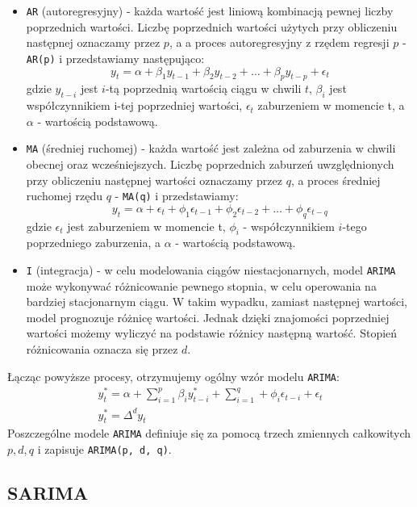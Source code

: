 \documentclass[12pt]{article}
\begin{document}
\begin{itemize}
    \item \texttt{AR} (autoregresyjny) - każda wartość jest liniową kombinacją pewnej liczby poprzednich wartości. Liczbę poprzednich wartości użytych przy obliczeniu następnej oznaczamy przez $p$, a a proces autoregresyjny z rzędem regresji $p$ - \texttt{AR(p)} i przedstawiamy następująco:
    \[
        y_t = \alpha + \beta_1y_{t-1} + \beta_2y_{t-2} + \dots + \beta_py_{t-p} + \epsilon_t
    \]
    gdzie $y_{t-i}$ jest $i$-tą poprzednią wartością ciągu w chwili $t$, $\beta_i$ jest współczynnikiem i-tej poprzedniej wartości, $\epsilon_t$ zaburzeniem w momencie t, a $\alpha$ - wartością podstawową.
    \item \texttt{MA} (średniej ruchomej) - każda wartość jest zależna od zaburzenia w chwili obecnej oraz wcześniejszych. Liczbę poprzednich zaburzeń uwzględnionych przy obliczeniu następnej wartości oznaczamy przez $q$, a proces średniej ruchomej rzędu $q$ - \texttt{MA(q)} i przedstawiamy:
    \[
        y_t = \alpha + \epsilon_t + \phi_1\epsilon_{t-1} + \phi_2\epsilon_{t-2} + \dots + \phi_q\epsilon_{t-q}
    \]
    gdzie $\epsilon_t$ jest zaburzeniem w momencie t, $\phi_i$ - współczynnikiem $i$-tego poprzedniego zaburzenia, a $\alpha$ - wartością podstawową.
    \item \texttt{I} (integracja) - w celu modelowania ciągów niestacjonarnych, model \texttt{ARIMA} może wykonywać różnicowanie pewnego stopnia, w celu operowania na bardziej stacjonarnym ciągu. W takim wypadku, zamiast następnej wartości, model prognozuje różnicę wartości. Jednak dzięki znajomości poprzedniej wartości możemy wyliczyć na podstawie różnicy następną wartość. Stopień różnicowania oznacza się przez $d$.
\end{itemize}

Łącząc powyższe procesy, otrzymujemy ogólny wzór modelu \texttt{ARIMA}:
\begin{gather*}
    y_t^* = \alpha + \sum^p_{i=1}\beta_iy^*_{t-i} + \sum^q_{i=1} + \phi_i\epsilon_{t-i} + \epsilon_t \\
    y_t^* = \Delta^dy_t
\end{gather*}
Poszczególne modele \texttt{ARIMA} definiuje się za pomocą trzech zmiennych całkowitych $p, d, q$ i zapisuje \texttt{ARIMA(p, d, q)}.

\subsection{SARIMA}
\end{document}
